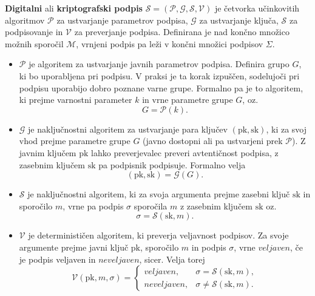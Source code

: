 \documentclass[isrm2, tisk]{fmfdelo}
\begin{document}
\begin{definicija}
\label{def:digisig}
    \textbf{Digitalni} ali \textbf{kriptografski podpis} $\mathcal{S} = (\mathcal{P}, \mathcal{G},
    \mathcal{S}, \mathcal{V})$ je četvorka učinkovitih algoritmov $\mathcal{P}$ za ustvarjanje parametrov
    podpisa, $\mathcal{G}$ za ustvarjanje ključa, $\mathcal{S}$ za podpisovanje in $\mathcal{V}$ za
    preverjanje podpisa. Definirana je nad končno množico možnih  sporočil $\mathcal{M}$, vrnjeni
    podpis pa leži v končni množici podpisov $\Sigma$.
    \begin{itemize}
        \item $\mathcal{P}$ je algoritem za ustvarjanje javnih parametrov podpisa. Definira grupo $G$,
            ki bo uporabljena pri podpisu. V praksi je ta korak izpuščen, sodelujoči pri podpisu
            uporabijo dobro poznane varne grupe. Formalno pa je to algoritem, ki prejme varnostni
            parameter $k$ in vrne parametre grupe $G$, oz.\
            $$
            G = \mathcal{P}(k).
            $$
        \item $\mathcal{G}$ je naključnostni algoritem za ustvarjanje para ključev $(\text{pk}, \text{sk})$, 
            ki za svoj vhod prejme parametre grupe $G$ (javno dostopni ali pa ustvarjeni prek $\mathcal{P}$).
            Z javnim ključem $\text{pk}$ lahko preverjevalec preveri avtentičnost podpisa, z zasebnim
            ključem $\text{sk}$ pa podpisnik podpisuje. Formalno velja
            $$
            (\text{pk}, \text{sk}) = \mathcal{G}(G).
            $$
        \item $\mathcal{S}$ je naključnostni algoritem, ki za svoja argumenta prejme zasebni ključ $\text{sk}$ 
            in sporočilo $m$, vrne pa podpis $\sigma$ sporočila $m$ z zasebnim ključem $\text{sk}$
            oz.\ 
            $$ 
            \sigma = \mathcal{S}(\text{sk}, m).
            $$
        \item $\mathcal{V}$ je determinističen algoritem, ki preverja veljavnost podpisov. Za svoje argumente
            prejme javni ključ $\text{pk}$, sporočilo $m$ in podpis $\sigma$, vrne $veljaven$, če je podpis 
            veljaven in $neveljaven$, sicer. Velja torej
            $$ 
            \mathcal{V}(\text{pk}, m, \sigma) = 
            \begin{cases}
                veljaven, & \sigma = \mathcal{S}(\text{sk}, m), \\
                neveljaven, & \sigma \neq \mathcal{S}(\text{sk}, m).
            \end{cases}
            $$
    \end{itemize}
\end{definicija}
\end{document}
